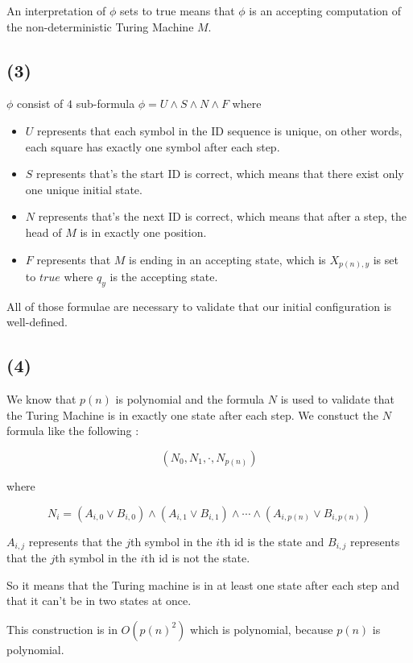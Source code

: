 \documentclass[a4paper,11pt]{report}
\begin{document}
An interpretation of $\phi$ sets to true means that $\phi$ is an accepting
computation of the non-deterministic Turing Machine $M$.

\subsection*{(3)}

$\phi$ consist of $4$ sub-formula $\phi = U \wedge S \wedge N \wedge F$ where
\begin{itemize}
\item $U$ represents that each symbol in the ID sequence is unique, on other
  words, each square has exactly one symbol after each step.
\item $S$ represents that's the start ID is correct, which means that there
  exist only one unique initial state. 
\item $N$ represents that's the next ID is correct, which means that after a
  step, the head of $M$ is in exactly one position.
\item $F$ represents that $M$ is ending in an accepting state, which is
  $X_{p(n),y}$ is set to $true$ where $q_y$ is the accepting state.
\end{itemize}

All of those formulae are necessary to validate that our initial configuration
is well-defined.

\subsection*{(4)}

We know that $p(n)$ is polynomial and the formula $N$ is used to validate that
the Turing Machine is in exactly one state after each step. We constuct the $N$
formula like the following :

\[
  (N_0,N_1,\cdot,N_{p(n)})
\]

where

\[
  N_i = (A_{i,0} \vee B_{i,0}) \wedge (A_{i,1} \vee B_{i,1}) \wedge \cdots \wedge (A_{i,p(n)} \vee B_{i,p(n)})
\]

$A_{i,j}$ represents that the $j$th symbol in the $i$th id is the state and
$B_{i,j}$ represents that the $j$th symbol in the $i$th id is not the state.

So it means that the Turing machine is in at least one state after each step and
that it can't be in two states at once.

This construction is in $O(p(n)^2)$ which is polynomial, because $p(n)$ is polynomial.
\end{document}
